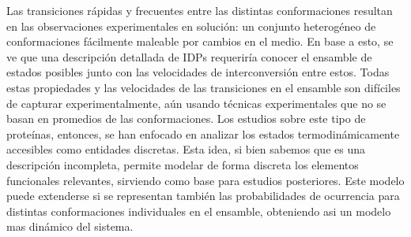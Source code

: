 


Las transiciones rápidas y frecuentes entre las distintas conformaciones resultan en las observaciones experimentales en solución: un conjunto heterogéneo de conformaciones fácilmente maleable por cambios en el medio. 
En base a esto, se ve que una descripción detallada de IDPs requeriría conocer el ensamble de estados posibles junto con las velocidades de interconversión entre estos.
Todas estas propiedades y las velocidades de las transiciones en el ensamble son difíciles de capturar experimentalmente, aún usando técnicas experimentales que no se basan en promedios de las conformaciones.
Los estudios sobre este tipo de proteínas, entonces, se han enfocado en analizar los estados termodinámicamente accesibles como entidades discretas.
Esta idea, si bien sabemos que es una descripción incompleta, permite modelar de forma discreta los elementos funcionales relevantes, sirviendo como base para estudios posteriores.
Este modelo puede extenderse si se representan también las probabilidades de ocurrencia para distintas conformaciones individuales en el ensamble, obteniendo asi un modelo mas dinámico del sistema.






